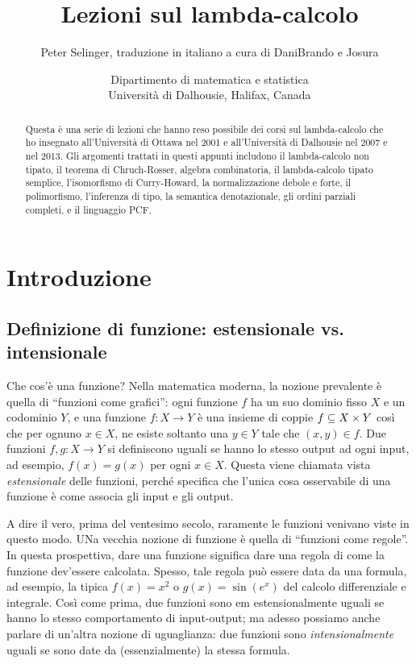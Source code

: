 \documentclass{article}
\title{Lezioni sul lambda-calcolo}
\author{Peter Selinger, traduzione in italiano a cura di DaniBrando e Josura}
\date{Dipartimento di matematica e statistica\\
  Universit\`a di Dalhousie, Halifax, Canada}
\begin{document}
\maketitle

\begin{abstract}
Questa \`e una serie di lezioni che hanno reso possibile dei corsi sul 
lambda-calcolo che ho insegnato all'Universit\`a di Ottawa nel 2001 e 
all'Universit\`a di Dalhousie nel 2007 e nel 2013. Gli argomenti trattati 
in questi appunti includono il lambda-calcolo non tipato, il teorema 
di Chruch-Rosser, algebra combinatoria, il lambda-calcolo tipato semplice, 
l'isomorfismo di Curry-Howard, la normalizzazione debole 
e forte, il polimorfismo, l'inferenza di tipo, la semantica denotazionale, 
gli ordini parziali completi, e il linguaggio PCF.
\end{abstract}

\tableofcontents

\newpage

\section{Introduzione}\label{sec-intro}

\subsection{Definizione di funzione: estensionale vs. intensionale}
\label{subsec-intro1}

Che cos'\`e una funzione? Nella matematica moderna, la nozione prevalente
\`e quella di ``funzioni come grafici'': ogni funzione $f$ ha un suo dominio
fisso $X$ e un codominio $Y$, e una funzione $f:X\to Y$ \`e una insieme di coppie
$f\subseteq X\times Y$ cos\`i che per ognuno $x\in X$, ne esiste soltanto
una $y\in Y$ tale che $(x,y)\in f$. Due funzioni $f,g:X\to Y$ si
definiscono uguali se hanno lo stesso output ad ogni input, ad esempio,
$f(x)=g(x)$ per ogni $x\in X$. Questa viene chiamata vista {\em estensionale}
delle funzioni, perché specifica che l'unica cosa osservabile 
di una funzione \`e come associa gli input e gli output.

A dire il vero, prima del ventesimo secolo, raramente le funzioni venivano
viste in questo modo. UNa vecchia nozione di funzione \`e quella di ``funzioni come 
regole''. In questa prospettiva, dare una funzione significa dare una regola di
come la funzione dev'essere calcolata. Spesso, tale regola pu\`o essere data da
una formula, ad esempio, la tipica $f(x)=x^2$ o $g(x)=\sin(e^x)$
del calcolo differenziale e integrale. Cos\`i come prima, due funzioni
sono {em estensionalmente} uguali se hanno lo stesso comportamento di input-output;
ma adesso possiamo anche parlare di un'altra nozione di uguaglianza: due funzioni sono
{\em intensionalmente} uguali se sono date da (essenzialmente) la
stessa formula.
\end{document}
